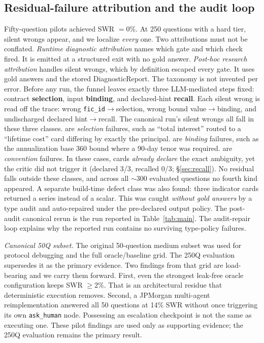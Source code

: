 \subsection{Residual-failure attribution and the audit loop}\label{sec:attribution}
Fifty-question pilots achieved SWR $=0\%$.
At 250 questions with a hard tier, silent wrongs appear, and we localize \emph{every} one.
Two attributions must not be conflated.
\emph{Runtime diagnostic attribution} names which gate and which check fired.
It is emitted at a structured exit with no gold answer.
\emph{Post-hoc research attribution} handles silent wrongs, which by definition escaped every gate.
It uses gold answers and the stored DiagnosticReport.
The taxonomy is not invented per error.
Before any run, the funnel leaves exactly three LLM-mediated steps fixed: contract \textbf{selection}, input \textbf{binding}, and declared-hint \textbf{recall}.
Each silent wrong is read off the trace: wrong \texttt{fic\_id}$\rightarrow$selection, wrong bound value$\rightarrow$binding, and undischarged declared hint$\rightarrow$recall.
The canonical run's \swResidualCanon{} silent wrongs all fall in these three classes.
\swCanonB{} are \emph{selection} failures, such as ``total interest'' routed to a ``lifetime cost'' card differing by exactly the principal.
\swCanonC{} are \emph{binding} failures, such as the annualization base 360 bound where a 90-day tenor was required.
\swCanonD{} are \emph{convention} failures.
In these cases, cards \emph{already declare} the exact ambiguity, yet the critic did not trigger it (declared 3/3, recalled 0/3; \S\ref{sec:recall}).
No residual falls outside these classes, and across all ${\sim}300$ evaluated questions no fourth kind appeared.
A separate build-time defect class was also found: three indicator cards returned a series instead of a scalar.
This was caught \emph{without gold answers} by a type audit and auto-repaired under the pre-declared output policy.
The post-audit canonical rerun is the run reported in Table~\ref{tab:main}.
The audit-repair loop explains why the reported run contains no surviving type-policy failures.

\emph{Canonical 50Q subset.} The original 50-question medium subset was used for protocol debugging and the full oracle/baseline grid.
The 250Q evaluation supersedes it as the primary evidence.
Two findings from that grid are load-bearing and we carry them forward.
First, even the strongest leak-free oracle configuration keeps SWR ${\geq}2\%$.
That is an architectural residue that deterministic execution removes.
Second, a JPMorgan multi-agent reimplementation answered all 50 questions at 14\% SWR without once triggering its own \texttt{ask\_human} node.
Possessing an escalation checkpoint is not the same as executing one.
These pilot findings are used only as supporting evidence; the 250Q evaluation remains the primary result.

